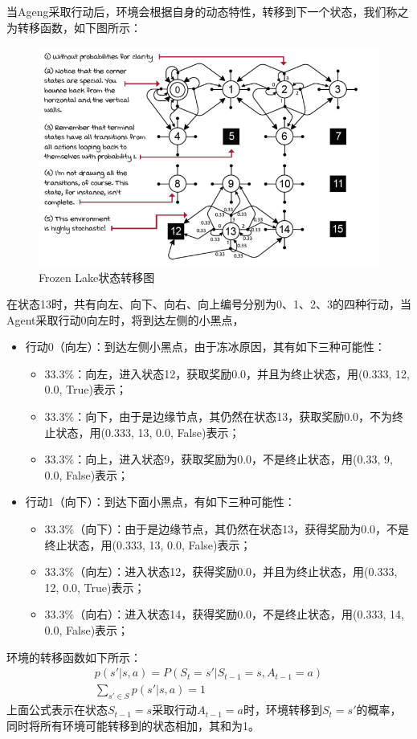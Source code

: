 当Ageng采取行动后，环境会根据自身的动态特性，转移到下一个状态，我们称之为转移函数，如下图所示：
\begin{figure}[H]
	\caption{Frozen Lake状态转移图}
	\label{p000008}
	\centering
	\includegraphics[width=15cm]{images/p000008}
\end{figure}
在状态13时，共有向左、向下、向右、向上编号分别为0、1、2、3的四种行动，当Agent采取行动0向左时，将到达左侧的小黑点，
\begin{itemize}
    \item 行动0（向左）：到达左侧小黑点，由于冻冰原因，其有如下三种可能性：
    \begin{itemize}
        \item 33.3\%：向左，进入状态12，获取奖励0.0，并且为终止状态，用(0.333, 12, 0.0, True)表示；
        \item 33.3\%：向下，由于是边缘节点，其仍然在状态13，获取奖励0.0，不为终止状态，用(0.333, 13, 0.0, False)表示；
        \item 33.3\%：向上，进入状态9，获取奖励为0.0，不是终止状态，用(0.33, 9, 0.0, False)表示；
    \end{itemize}
    \item 行动1（向下）：到达下面小黑点，有如下三种可能性：
    \begin{itemize}
        \item 33.3\%（向下）：由于是边缘节点，其仍然在状态13，获得奖励为0.0，不是终止状态，用(0.333, 13, 0.0, False)表示；
        \item 33.3\%（向左）：进入状态12，获得奖励0.0，并且为终止状态，用(0.333, 12, 0.0, True)表示；
        \item 33.3\%（向右）：进入状态14，获得奖励0.0，不是终止状态，用(0.333, 14, 0.0, False)表示；
    \end{itemize}
\end{itemize}
环境的转移函数如下所示：
\begin{equation}
\begin{aligned}
p(s' | s, a) = P(S_{t}=s' | S_{t-1}=s, A_{t-1}=a) \\
\sum_{s' \in S} p(s' | s, a) = 1
\end{aligned}
\label{markov-property-def}
\end{equation}
上面公式表示在状态$S_{t-1}=s$采取行动$A_{t-1}=a$时，环境转移到$S_{t}=s'$的概率，同时将所有环境可能转移到的状态相加，其和为1。

